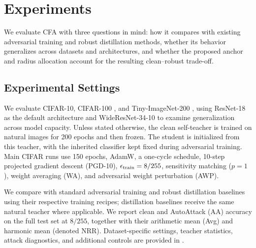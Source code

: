 \documentclass{article} %
\theoremstyle{plain}
\begin{document}
\section{Experiments}
\label{sec:exp}

We evaluate CFA with three questions in mind: how it compares with existing adversarial training and robust distillation methods, whether its behavior generalizes across datasets and architectures, and whether the proposed anchor and radius allocation account for the resulting clean--robust trade-off.

\subsection{Experimental Settings}
We evaluate CIFAR-10, CIFAR-100 \citep{krizhevsky2009learning}, and Tiny-ImageNet-200 \citep{le2015tiny}, using ResNet-18 as the default architecture and WideResNet-34-10 to examine generalization across model capacity. Unless stated otherwise, the clean self-teacher is trained on natural images for 200 epochs and then frozen. The student is initialized from this teacher, with the inherited classifier kept fixed during adversarial training. Main CIFAR runs use 150 epochs, AdamW, a one-cycle schedule, 10-step projected gradient descent (PGD-10), \(\epsilon_{\rm train}=8/255\), sensitivity matching (\(p=1\)), weight averaging (WA), and adversarial weight perturbation (AWP).

We compare with standard adversarial training and robust distillation baselines using their respective training recipes; distillation baselines receive the same natural teacher where applicable. We report clean and AutoAttack (AA) accuracy on the full test set at \(8/255\), together with their arithmetic mean (Avg) and harmonic mean (denoted NRR). Dataset-specific settings, teacher statistics, attack diagnostics, and additional controls are provided in .
\end{document}
